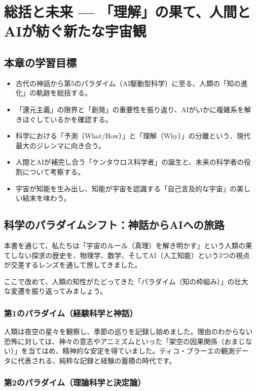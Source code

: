 \chapter{総括と未来 --- 「理解」の果て、人間とAIが紡ぐ新たな宇宙観}

\section*{本章の学習目標}
\begin{itemize}
\item 古代の神話から第5のパラダイム（AI駆動型科学）に至る、人類の「知の進化」の軌跡を総括する。
\item 「還元主義」の限界と「創発」の重要性を振り返り、AIがいかに複雑系を解きほぐしているかを確認する。
\item 科学における「予測（What/How）」と「理解（Why）」の分離という、現代最大のジレンマに向き合う。
\item 人間とAIが補完し合う「ケンタウロス科学者」の誕生と、未来の科学者の役割について考察する。
\item 宇宙が知能を生み出し、知能が宇宙を認識する「自己言及的な宇宙」の美しい結末を味わう。
\end{itemize}

\section{科学のパラダイムシフト：神話からAIへの旅路}

本書を通じて、私たちは「宇宙のルール（真理）を解き明かす」という人類の果てしない探求の歴史を、物理学、数学、そしてAI（人工知能）という3つの視点が交差するレンズを通して旅してきました。

ここで改めて、人類の知性がたどってきた「パラダイム（知の枠組み）」の壮大な変遷を振り返ってみましょう。

\subsection{第1のパラダイム（経験科学と神話）}

人類は夜空の星々を観察し、季節の巡りを記録し始めました。理由のわからない恐怖に対しては、神々の意志やアニミズムといった「架空の因果関係（おまじない）」を当てはめ、精神的な安定を得ていました。ティコ・ブラーエの観測データに代表される、純粋な記録と経験の蓄積の時代です。

\subsection{第2のパラダイム（理論科学と決定論）}

